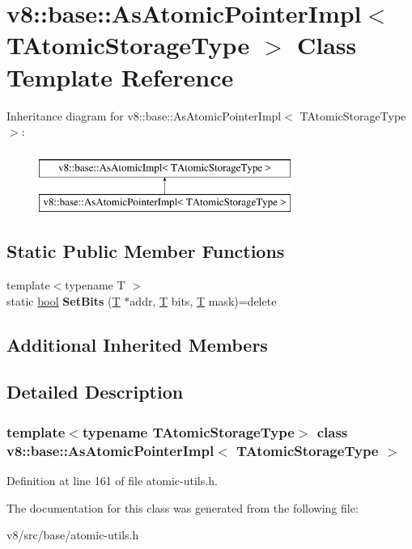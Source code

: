 \hypertarget{classv8_1_1base_1_1AsAtomicPointerImpl}{}\section{v8\+:\+:base\+:\+:As\+Atomic\+Pointer\+Impl$<$ T\+Atomic\+Storage\+Type $>$ Class Template Reference}
\label{classv8_1_1base_1_1AsAtomicPointerImpl}
Inheritance diagram for v8\+:\+:base\+:\+:As\+Atomic\+Pointer\+Impl$<$ T\+Atomic\+Storage\+Type $>$\+:\begin{figure}[H]
\begin{center}
\leavevmode
\includegraphics[height=2.000000cm]{classv8_1_1base_1_1AsAtomicPointerImpl}
\end{center}
\end{figure}
\subsection*{Static Public Member Functions}
\begin{DoxyCompactItemize}
\item 
\mbox{\label{classv8_1_1base_1_1AsAtomicPointerImpl_af70eab4d60ff6f04ca5877f750c61cbf}} 
{\footnotesize template$<$typename T $>$ }\\static \mbox{\hyperlink{classbool}{bool}} {\bfseries Set\+Bits} (\mbox{\hyperlink{classv8_1_1internal_1_1torque_1_1T}{T}} $\ast$addr, \mbox{\hyperlink{classv8_1_1internal_1_1torque_1_1T}{T}} bits, \mbox{\hyperlink{classv8_1_1internal_1_1torque_1_1T}{T}} mask)=delete
\end{DoxyCompactItemize}
\subsection*{Additional Inherited Members}


\subsection{Detailed Description}
\subsubsection*{template$<$typename T\+Atomic\+Storage\+Type$>$\newline
class v8\+::base\+::\+As\+Atomic\+Pointer\+Impl$<$ T\+Atomic\+Storage\+Type $>$}



Definition at line 161 of file atomic-\/utils.\+h.



The documentation for this class was generated from the following file\+:\begin{DoxyCompactItemize}
\item 
v8/src/base/atomic-\/utils.\+h\end{DoxyCompactItemize}
